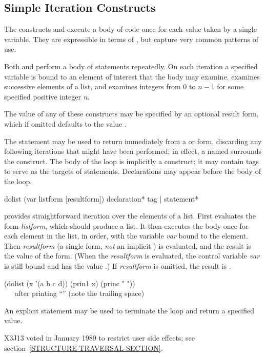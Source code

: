 \subsection{Simple Iteration Constructs}

The constructs  and  execute a body of code
once for each value taken by a single variable.  They are expressible
in terms of , but capture very common patterns of use.

Both  and  perform
a body of statements repeatedly.  On each iteration a specified
variable is bound to an element of interest that the body may
examine.   examines successive elements of a list,
and  examines integers from 0 to $n-1$
for some specified positive integer \emph{n}.

The value of any of these constructs may be specified by an optional result
form, which if omitted defaults to the value {\false}.

The  statement may be used to return
immediately from a  or  form,
discarding any following iterations
that might have been performed; in effect, a  named {\nil}
surrounds the construct.
The body of the loop is implicitly a  construct;
it may contain tags to serve as the targets of  statements.
Declarations may appear before the body of the loop.

\begin{defmac}
dolist (var listform [resultform])
       {declaration}* {tag | statement}*

 provides straightforward iteration over the elements of a list.
First 
evaluates the form \emph{listform},
which should produce a list.  It then executes the body
once for each element in the list, in order, with
the variable \emph{var} bound to the element.
Then \emph{resultform} (a single form, \emph{not} an implicit )
is evaluated, and the result is the value of the 
form.  (When the \emph{resultform} is evaluated, the control variable \emph{var}
is still bound and has the value {\nil}.)
If \emph{resultform} is omitted, the result is {\false}.

\begin{lisp}
(dolist (x '(a b c d)) (prin1 x) (princ " ")) \EV\ {\false} \\
~~~\textrm{after printing ``'' (note the trailing space)}
\end{lisp}

An explicit  statement may be used to terminate the loop
and return a specified value.

\begin{new}
X3J13 voted in January 1989
to restrict user side effects; see section~\ref{STRUCTURE-TRAVERSAL-SECTION}.
\end{new}
\end{defmac}

